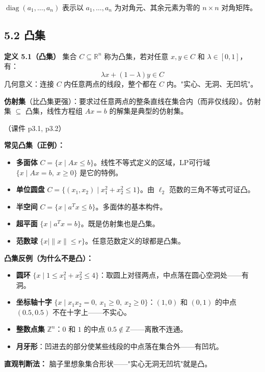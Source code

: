 $\operatorname{diag}(a_1,\dots,a_n)$ 表示以 $a_1,\dots,a_n$ 为对角元、其余元素为零的 $n\times n$ 对角矩阵。

\subsection{5.2 凸集}

\textbf{定义 5.1（凸集）}
集合 $C \subseteq \mathbb{R}^n$ 称为凸集，若对任意 $x,y \in C$ 和 $\lambda \in [0,1]$，有：
\[
\lambda x + (1-\lambda) y \in C
\]
几何意义：连接 $C$ 内任意两点的线段，整个都在 $C$ 内。"实心、无洞、无凹坑"。

\textbf{仿射集}（比凸集更强）：要求过任意两点的整条直线在集合内（而非仅线段）。仿射集 $\subseteq$ 凸集，线性方程组 $Ax=b$ 的解集是典型的仿射集。

（课件 p3.1, p3.2）

\textbf{常见凸集（正例）：}
\begin{itemize}
  \item \textbf{多面体} $C = \{x \mid Ax \le b\}$。线性不等式定义的区域，LP可行域 $\{x\mid Ax=b,\ x\ge 0\}$ 是它的特例。
  \item \textbf{单位圆盘} $C = \{(x_1,x_2) \mid x_1^2+x_2^2 \le 1\}$。由 $\ell_2$ 范数的三角不等式可证凸。
  \item \textbf{半空间} $C = \{x \mid a^T x \le b\}$。多面体的基本构件。
  \item \textbf{超平面} $\{x \mid a^T x = b\}$。既是仿射集也是凸集。
  \item \textbf{范数球} $\{x \mid \|x\| \le r\}$。任意范数定义的球都是凸集。
\end{itemize}

\textbf{凸集反例（为什么不是凸）：}
\begin{itemize}
  \item \textbf{圆环} $\{x \mid 1 \le x_1^2+x_2^2 \le 4\}$：取圆上对径两点，中点落在圆心空洞处——有洞。
  \item \textbf{坐标轴十字} $\{x \mid x_1 x_2 = 0,\ x_1 \ge 0,\ x_2 \ge 0\}$：$(1,0)$ 和 $(0,1)$ 的中点 $(0.5,0.5)$ 不在十字上——不实心。
  \item \textbf{整数点集} $\mathbb{Z}^n$：$0$ 和 $1$ 的中点 $0.5 \notin \mathbb{Z}$——离散不连通。
  \item \textbf{月牙形}：凹进去的部分使某些线段的中点落在集合外——有凹坑。
\end{itemize}

\textbf{直观判断法：} 脑子里想象集合形状——"实心无洞无凹坑"就是凸。

